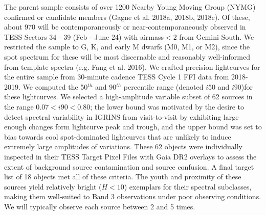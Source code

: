 \documentclass[11pt]{article}
\begin{document}
{The parent sample consists of over 1200 Nearby Young Moving Group (NYMG) confirmed or candidate members (Gagne et al. 2018a, 2018b, 2018c).  Of these, about 970 will be contemporaneously or near-contemporaneously observed in TESS Sectors 34 - 39 (Feb - June 24) with airmass$<2$ from Gemini South. We restricted the sample to G, K, and early M dwarfs (M0, M1, or M2), since the spot spectrum for these will be most discernable and reasonably well-informed from template spectra (e.g. Fang et al. 2016).  We crafted precision lightcurves for the entire sample from 30-minute cadence TESS Cycle 1 FFI data from 2018-2019.  We computed the 50$^{th}$ and 90$^{th}$ percentile range (denoted $i50$ and $i90$)for these lightcurves.  We selected a high-amplitude variable subset of 62 sources in the range $0.07 < i90 < 0.80$; the lower bound was motivated by the desire to detect spectral variability in IGRINS from visit-to-visit by exhibiting large enough changes form lightcurve peak and trough, and the upper bound was set to bias towards cool spot-dominated lightcurves that are unlikely to induce extremely large amplitudes of variations.  These 62 objects were individually inspected in their TESS Target Pixel Files with Gaia DR2 overlays to assess the extent of background source contamination and source confusion.  A final target list of 18 objects met all of these criteria.  The youth and proximity of these sources yield relatively bright ($H<10$) exemplars for their spectral subclasses, making them well-suited to Band 3 observations under poor observing conditions.  We will typically observe each source between 2 and 5 times.

%



}
\end{document}
